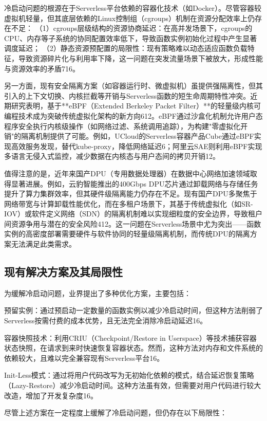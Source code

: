 冷启动问题的根源在于Serverless平台依赖的容器化技术（如Docker）。尽管容器较虚拟机轻量，但其底层依赖的Linux控制组（cgroups）机制在资源分配效率上仍存在不足：
（1）cgroups层级结构的资源协商延迟：在高并发场景下，cgroups的CPU、内存等子系统的协同配置效率低下，导致函数实例初始化过程中产生显著调度延迟；
（2）静态资源预配置的局限性：现有策略难以动态适应函数负载特征，导致资源碎片化与利用率下降，这一问题在突发流量场景下被放大，形成性能与资源效率的矛盾716。

另一方面，现有安全隔离方案（如容器运行时、微虚拟机）虽提供强隔离性，但其引入的上下文切换、内核拦截等开销与Serverless函数的短生命周期特性冲突。近期研究表明，基于**eBPF（Extended Berkeley Packet Filter）**的轻量级内核可编程技术成为突破传统虚拟化架构的新方向612。eBPF通过沙盒化机制允许用户态程序安全执行内核级操作（如网络过滤、系统调用追踪），为构建"零虚拟化开销"的隔离机制提供了可能。例如，UCloud的Serverless容器产品Cube通过eBPF实现高效服务发现，替代kube-proxy，降低网络延迟6；阿里云SAE则利用eBPF实现多语言无侵入式监控，减少数据在内核态与用户态间的拷贝开销12。

值得注意的是，近年来国产DPU（专用数据处理器）在数据中心网络加速领域取得显著进展。例如，云豹智能推出的400Gbps DPU芯片通过卸载网络与存储任务提升了算力集群效率，但其硬件级隔离能力仍存在不足。现有国产DPU多聚焦于网络带宽与计算卸载性能优化，而在多租户场景下，其基于传统虚拟化（如SR-IOV）或软件定义网络（SDN）的隔离机制难以实现细粒度的安全边界，导致租户间资源争用与潜在的安全风险412。这一问题在Serverless场景中尤为突出——函数实例的高密度部署需要硬件与软件协同的轻量级隔离机制，而传统DPU的隔离方案无法满足此类需求。



\subsection{现有解决方案及其局限性} 
为缓解冷启动问题，业界提出了多种优化方案，主要包括：

预留实例：通过预启动一定数量的函数实例以减少冷启动时间，但这种方法削弱了Serverless按需付费的成本优势，且无法完全消除冷启动延迟16。

容器快照技术：利用CRIU（Checkpoint/Restore in Userspace）等技术捕获容器状态快照，在请求到来时快速恢复容器状态。然而，这种方法对内存和文件系统的依赖较大，且难以完全兼容现有Serverless平台16。

Init-Less模式：通过将用户代码改写为无初始化依赖的模式，结合延迟恢复策略（Lazy-Restore）减少冷启动时间。这种方法虽有效，但需要对用户代码进行较大改造，增加了开发复杂度16。

尽管上述方案在一定程度上缓解了冷启动问题，但仍存在以下局限性：

